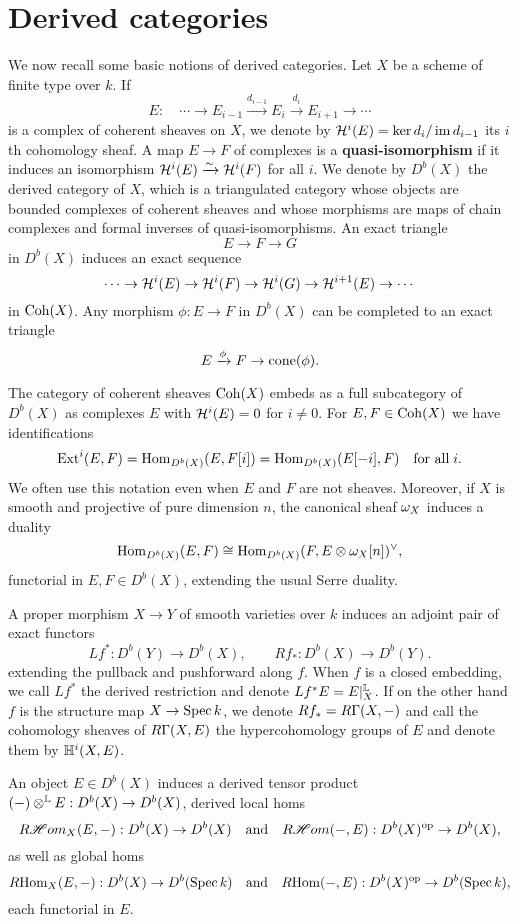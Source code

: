 \section{Derived categories}
We now recall some basic notions of derived categories. Let $X$ be a scheme of finite type over $k$. If
\[ E: \quad \cdots \to E_{i-1} \xrightarrow{d_{i-1}} E_i \xrightarrow{d_i} E_{i+1} \to \cdots \]
is a complex of coherent sheaves on $X$, we denote by $\mathcal{H}^i(E) = \ker d_i/\operatorname{\mathrm{im}} d_{i-1}$ its $i$th cohomology sheaf. A map $E \to F$ of complexes is a \textbf{quasi-isomorphism} if it induces an isomorphism $\mathcal{H}^i(E) \xrightarrow{\sim} \mathcal{H}^i(F)$ for all $i$. We denote by $D^b(X)$ the derived category of $X$, which is a triangulated category whose objects are bounded complexes of coherent sheaves and whose morphisms are maps of chain complexes and formal inverses of quasi-isomorphisms. An exact triangle
\[ E \to F \to G \]
in $D^b(X)$ induces an exact sequence
\[ \cdots \to \mathcal{H}^i(E) \to \mathcal{H}^i(F) \to \mathcal{H}^i(G) \to \mathcal{H}^{i+1}(E) \to \cdots \]
in $\operatorname{\mathrm{Coh}}(X)$. Any morphism $\phi: E \to F$ in $D^b(X)$ can be completed to an exact triangle
\[ E \xrightarrow{\phi} F \to \operatorname{\mathrm{cone}}(\phi). \]

The category of coherent sheaves $\operatorname{\mathrm{Coh}}(X)$ embeds as a full subcategory of $D^b(X)$ as complexes $E$ with $\mathcal{H}^i(E) = 0$ for $i \neq 0$. For $E, F \in \operatorname{\mathrm{Coh}}(X)$ we have identifications
\[ \mathrm{Ext}^i(E,F) = \mathrm{Hom}_{D^b(X)}(E, F[i]) = \mathrm{Hom}_{D^b(X)}(E[-i], F) \quad \text{for all\;} i. \]
We often use this notation even when $E$ and $F$ are not sheaves. Moreover, if $X$ is smooth and projective of pure dimension $n$, the canonical sheaf $\omega_X$ induces a duality
\[ \mathrm{Hom}_{D^b(X)}(E, F) \cong \mathrm{Hom}_{D^b(X)}(F, E \otimes \omega_X[n])^\vee, \]
functorial in $E, F \in D^b(X)$, extending the usual Serre duality.

A proper morphism $X \to Y$ of smooth varieties over $k$ induces an adjoint pair of exact functors
\[ L f^*: D^b(Y) \to D^b(X), \qquad R f_*: D^b(X) \to D^b(Y). \]
extending the pullback and pushforward along $f$. When $f$ is a closed embedding, we call $L f^*$ the derived restriction and denote $L f^*E = E|^{\mathbb{L}}_X$. If on the other hand $f$ is the structure map $X \to \operatorname{\mathrm{Spec}} k$, we denote $R f_* = R\Gamma(X, -)$ and call the cohomology sheaves of $R\Gamma(X, E)$ the hypercohomology groups of $E$ and denote them by $\mathbb{H}^i(X, E)$.

An object $E \in D^b(X)$ induces a derived tensor product $(-) \otimes^{\mathbb{L}} E: D^b(X) \to D^b(X)$, derived local homs 
\[ R\mathscr{H}om_X(E,-): D^b(X) \to D^b(X) \quad \text{and} \quad R\mathscr{H}om(-, E): D^b(X)^{\text{op}} \to D^b(X), \]
as well as global homs 
\[ R\mathrm{Hom}_X(E,-): D^b(X) \to D^b(\operatorname{\mathrm{Spec}} k) \quad  \text{and} \quad R\mathrm{Hom}(-, E): D^b(X)^{\text{op}} \to D^b(\operatorname{\mathrm{Spec}} k), \]
each functorial in $E$.

